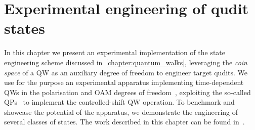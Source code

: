 
\chapter{Experimental engineering of qudit states}
\label{chapter:experimental_engineering_qudits}

 In this chapter we present an experimental implementation of the state engineering scheme discussed in~\cref{chapter:quantum_walks}, leveraging the \emph{coin space} of a \ac{QW} as an auxiliary degree of freedom to engineer target qudits.
We use for the purpose an experimental apparatus implementing time-dependent \acp{QW} in the polarisation and \ac{OAM} degrees of freedom~\cite{zhang2010implementation,goyal2013implementing,cardano2015quantum}, exploiting the so-called \acp{QP}~\cite{marrucci2006optical} to implement the controlled-shift QW operation.
To benchmark and showcase the potential of the apparatus, we demonstrate the engineering of several classes of states.
The work described in this chapter can be found in~\cite{giordani2019experimental}.




